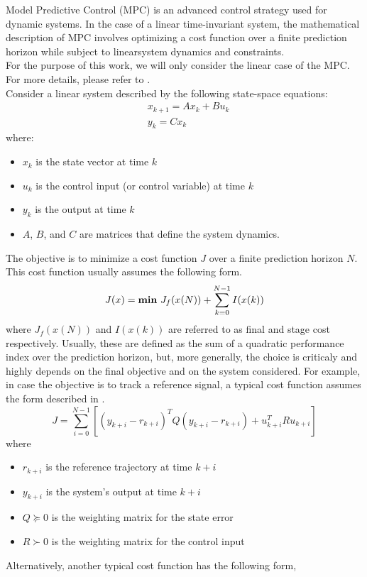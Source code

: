 Model Predictive Control (MPC) is an advanced control strategy used for dynamic systems. In the case of a linear time-invariant system, the mathematical description of MPC involves optimizing a cost function over a finite prediction horizon while subject to linearsystem dynamics and constraints. \\
For the purpose of this work, we will only consider the linear case of the MPC. For more details, please refer to \cite{rawlings2020model}. \\
Consider a linear system described by the following state-space equations:
\begin{align}
	&x_{k+1} = Ax_k + Bu_k \nonumber \\
	 &y_k = Cx_k \label{eq:linear_system}
\end{align}
where:
\begin{itemize}
	\item $x_k$ is the state vector at time $k$
	\item $u_k$ is the control input (or control variable) at time $k$
	\item $y_k$ is the output at time $k$
	\item $A$, $B$, and $C$ are matrices that define the system dynamics.
\end{itemize}
The objective is to minimize a cost function $J$ over a finite prediction horizon $N$. This cost function usually assumes the following form.
\begin{equation}
	J(x) = \text{\textbf{min} } J_f(x(N)) + \sum_{k =0}^{N-1}I(x(k))
\end{equation}
where $J_f(x(N))$ and $I(x(k))$ are referred to as final and stage cost respectively. Usually, 
these are defined as the sum of a quadratic performance index over the prediction horizon, but, more generally, the choice is criticaly and highly depends on the final objective and on the system considered. For example, in case the objective is to track a reference signal, a typical cost function assumes the form described in . 
\begin{equation}
	J = \sum_{i=0}^{N-1} \left[ (y_{k+i} - r_{k+i})^T Q (y_{k+i} - r_{k+i}) + u_{k+i}^T R u_{k+i} \right] 
	\label{eq:cost_f_1}
\end{equation} 
where
\begin{itemize}
	\item $r_{k+i}$ is the reference trajectory at time $k+i$
	\item $y_{k+i}$ is the system's output at time $k+i$
	\item $Q \succeq 0$ is the weighting matrix for the state error
	\item $R \succ 0$ is the weighting matrix for the control input
\end{itemize}
Alternatively, another typical cost function has the following form, 

